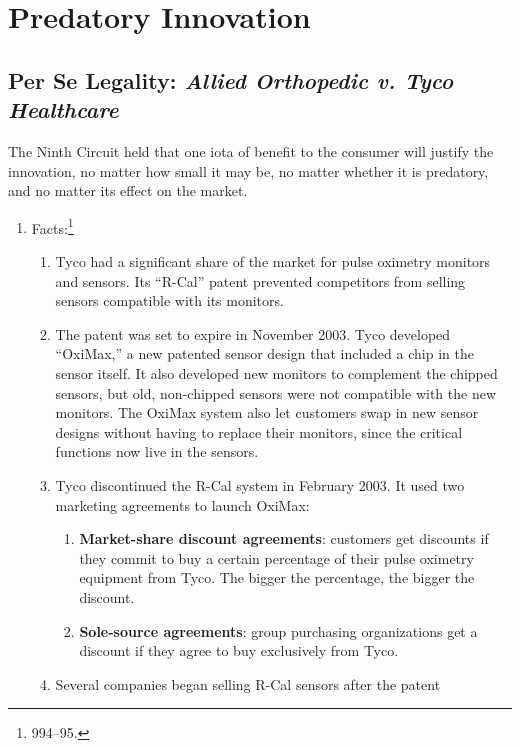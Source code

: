 \section{Predatory Innovation}

\subsection{Per Se Legality: \emph{Allied Orthopedic v. Tyco Healthcare}}

The Ninth Circuit held that one iota of benefit to the consumer will justify 
the innovation, no matter how small it may be, no matter whether it is 
predatory, and no matter its effect on the market.

\begin{enumerate}
    \item Facts:\footnote{994--95.}
    \begin{enumerate}
        \item Tyco had a significant share of the market for pulse oximetry 
        monitors and sensors. Its ``R-Cal'' patent prevented competitors from 
        selling sensors compatible with its monitors.
        \item The patent was set to expire in November 2003. Tyco developed 
        ``OxiMax,'' a new patented sensor design that included a chip in the 
        sensor itself. It also developed new monitors to complement the 
        chipped sensors, but old, non-chipped sensors were not compatible with 
        the new monitors. The OxiMax system also let customers swap in new 
        sensor designs without having to replace their monitors, since the 
        critical functions now live in the sensors.
        \item Tyco discontinued the R-Cal system in February 2003. It used two 
        marketing agreements to launch OxiMax:
        \begin{enumerate}
            \item \textbf{Market-share discount agreements}: customers get 
            discounts if they commit to buy a certain percentage of their 
            pulse oximetry equipment from Tyco. The bigger the percentage, the 
            bigger the discount.
            \item \textbf{Sole-source agreements}: group purchasing 
            organizations get a discount if they agree to buy exclusively from 
            Tyco.
        \end{enumerate}
        \item Several companies began selling R-Cal sensors after the patent 

\end{enumerate}
\end{enumerate}
